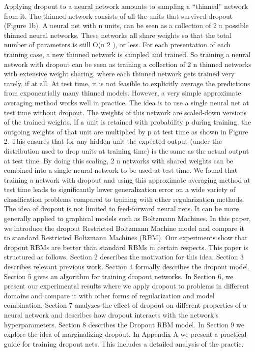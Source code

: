 Applying dropout to a neural network amounts to sampling a “thinned” network from
it. The thinned network consists of all the units that survived dropout (Figure 1b). A
neural net with n units, can be seen as a collection of 2 n possible thinned neural networks.
These networks all share weights so that the total number of parameters is still O(n 2 ), or
less. For each presentation of each training case, a new thinned network is sampled and
trained. So training a neural network with dropout can be seen as training a collection of 2 n
thinned networks with extensive weight sharing, where each thinned network gets trained
very rarely, if at all.
At test time, it is not feasible to explicitly average the predictions from exponentially
many thinned models. However, a very simple approximate averaging method works well in
practice. The idea is to use a single neural net at test time without dropout. The weights
of this network are scaled-down versions of the trained weights. If a unit is retained with
probability p during training, the outgoing weights of that unit are multiplied by p at test
time as shown in Figure 2. This ensures that for any hidden unit the expected output (under
the distribution used to drop units at training time) is the same as the actual output at
test time. By doing this scaling, 2 n networks with shared weights can be combined into
a single neural network to be used at test time. We found that training a network with
dropout and using this approximate averaging method at test time leads to significantly
lower generalization error on a wide variety of classification problems compared to training
with other regularization methods.
The idea of dropout is not limited to feed-forward neural nets. It can be more generally
applied to graphical models such as Boltzmann Machines. In this paper, we introduce
the dropout Restricted Boltzmann Machine model and compare it to standard Restricted
Boltzmann Machines (RBM). Our experiments show that dropout RBMs are better than
standard RBMs in certain respects.
This paper is structured as follows. Section 2 describes the motivation for this idea.
Section 3 describes relevant previous work. Section 4 formally describes the dropout model.
Section 5 gives an algorithm for training dropout networks. In Section 6, we present our
experimental results where we apply dropout to problems in different domains and compare
it with other forms of regularization and model combination. Section 7 analyzes the effect of
dropout on different properties of a neural network and describes how dropout interacts with
the network’s hyperparameters. Section 8 describes the Dropout RBM model. In Section 9
we explore the idea of marginalizing dropout. In Appendix A we present a practical guide
for training dropout nets. This includes a detailed analysis of the practic.
